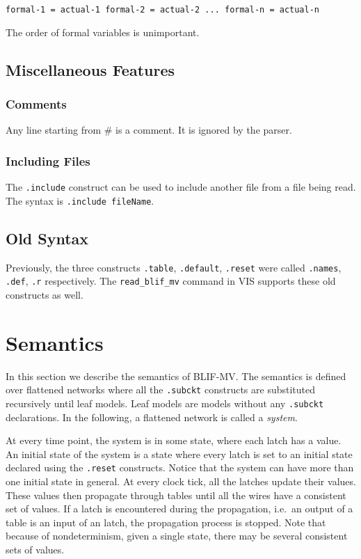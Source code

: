 \begin{verbatim}
formal-1 = actual-1 formal-2 = actual-2 ... formal-n = actual-n
\end{verbatim}

The order of formal variables is unimportant.

\subsection{Miscellaneous Features}
\subsubsection{Comments}
Any line starting from \# is a comment.
It is ignored by the parser.

\subsubsection{Including Files}
The {\tt .include} construct can be used to include another file
from a file being read.
The syntax is {\tt .include fileName}.

\subsection{Old Syntax}
Previously,
the three constructs {\tt .table}, {\tt .default}, {\tt .reset}
were called
{\tt .names}, {\tt .def}, {\tt .r}
respectively.
The {\tt read\_blif\_mv} command in VIS
supports these old constructs as well.


\section{Semantics}
In this section
we describe the semantics of BLIF-MV.
The semantics is defined over
flattened networks
where all the {\tt .subckt} constructs
are substituted recursively until leaf models.
Leaf models are models without any {\tt .subckt} declarations.
In the following, a flattened network is called a {\em system}.

At every time point,
the system is in some state,
where each latch has a value.
An initial state of the system is
a state
where every latch is set to an initial state
declared using the {\tt .reset} constructs.
Notice that
the system can have more than one initial state
in general.
At every clock tick,
all the latches update their values.
These values then propagate through tables
until all the wires have a consistent set of values.
If a latch is encountered during the propagation,
i.e.\ an output of a table is an input of an latch,
the propagation process is stopped.
Note that because of nondeterminism,
given a single state,
there may be several consistent sets of values.

